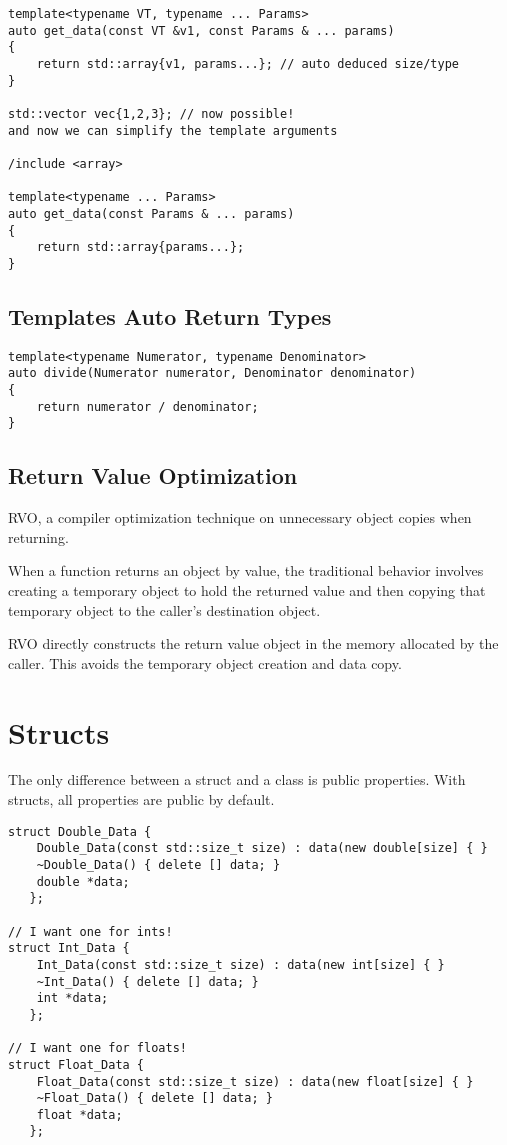 \begin{verbatim}
template<typename VT, typename ... Params>
auto get_data(const VT &v1, const Params & ... params)
{
    return std::array{v1, params...}; // auto deduced size/type
}

std::vector vec{1,2,3}; // now possible! 
and now we can simplify the template arguments

/include <array>

template<typename ... Params>
auto get_data(const Params & ... params)
{
    return std::array{params...};
}
\end{verbatim}

\subsection{Templates Auto Return Types}

\begin{verbatim}
template<typename Numerator, typename Denominator>
auto divide(Numerator numerator, Denominator denominator)
{
    return numerator / denominator;
}
\end{verbatim}


\subsection{Return Value Optimization}
RVO, a compiler optimization technique on 
unnecessary object copies when returning.


When a function returns an object by value,
the traditional behavior involves creating a temporary object to hold 
the returned value and then copying that temporary object to the caller's destination object.


RVO directly constructs the return value object in the memory allocated by the caller.
This avoids the temporary object creation and data copy.

\section{Structs}

The only difference between a struct and a class is public properties. With
structs, all properties are public by default.

\begin{verbatim}
struct Double_Data {
    Double_Data(const std::size_t size) : data(new double[size] { }
    ~Double_Data() { delete [] data; }
    double *data;
   };

// I want one for ints!
struct Int_Data {
    Int_Data(const std::size_t size) : data(new int[size] { }
    ~Int_Data() { delete [] data; }
    int *data;
   };

// I want one for floats!
struct Float_Data {
    Float_Data(const std::size_t size) : data(new float[size] { }
    ~Float_Data() { delete [] data; }
    float *data;
   };
\end{verbatim}

